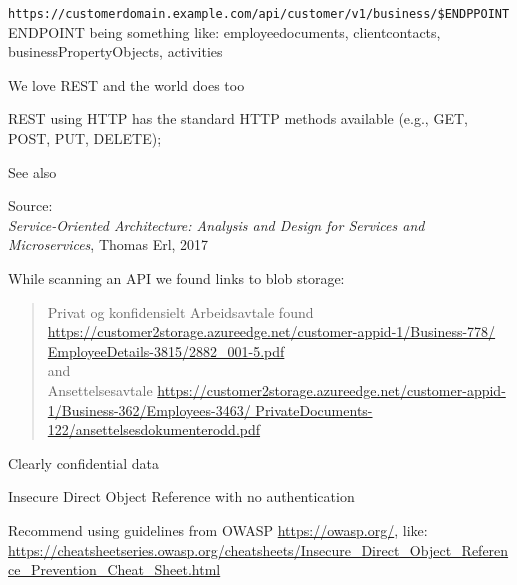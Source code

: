 \documentclass[Screen16to9,17pt]{foils}
\begin{document}

\verb+https://customerdomain.example.com/api/customer/v1/business/$ENDPPOINT+
ENDPOINT being something like: employeedocuments, clientcontacts, businessPropertyObjects, activities

\begin{list2}
\item    We love REST and the world does too
\end{list2}



\begin{list2}
\item REST using HTTP has the standard HTTP methods available (e.g., GET, POST, PUT, DELETE);
\item See also 
\end{list2}
Source: {\footnotesize\\
\emph{Service‑Oriented Architecture: Analysis and Design for Services and Microservices}, Thomas Erl, 2017}





While scanning an API we found links to blob storage:
\begin{quote}
    Privat og konfidensielt Arbeidsavtale found\\
    \url{https://customer2storage.azureedge.net/customer-appid-1/Business-778/
EmployeeDetails-3815/2882_001-5.pdf}\\
and\\
Ansettelsesavtale \url{https://customer2storage.azureedge.net/customer-appid-1/Business-362/Employees-3463/
PrivateDocuments-122/ansettelsesdokumenterodd.pdf}
\end{quote}
Clearly confidential data

\begin{list2}
    \item Insecure Direct Object Reference with no authentication
    \item Recommend using guidelines from OWASP \url{https://owasp.org/}, like:\\{\footnotesize
    \url{https://cheatsheetseries.owasp.org/cheatsheets/Insecure_Direct_Object_Reference_Prevention_Cheat_Sheet.html}}
\end{list2}
\end{document}
